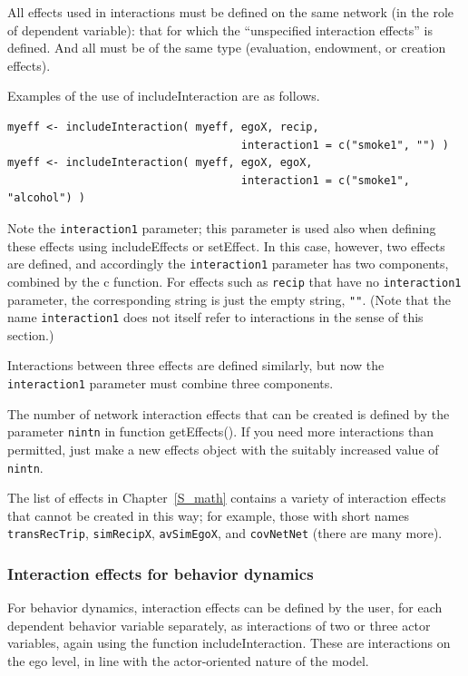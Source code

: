 \documentclass[a4paper,fleqn,11pt]{article}
\newcommand{\+}{\, + \,}
\newcommand{\sfn}[1]{\textsf{#1}}
\begin{document}
All effects used in interactions must be defined on the same network
(in the role of dependent variable): that for
which the ``unspecified
interaction effects'' is defined.  And all must be
of the same type (evaluation, endowment, or creation effects).

Examples of the use of \sfn{includeInteraction} are as follows.
\begin{verbatim}
myeff <- includeInteraction( myeff, egoX, recip,
                                    interaction1 = c("smoke1", "") )
myeff <- includeInteraction( myeff, egoX, egoX,
                                    interaction1 = c("smoke1", "alcohol") )
\end{verbatim}
Note the \texttt{interaction1} parameter; this parameter is used also
when defining these effects using \sfn{includeEffects} or
\sfn{setEffect}. In this case, however, two effects are defined,
and accordingly the \texttt{interaction1} parameter has two components,
combined by the \sfn{c} function.
For effects such as \texttt{recip} that have no \texttt{interaction1}
parameter, the corresponding string is just the empty string, \texttt{""}.
(Note that the name \texttt{interaction1} does not itself refer to interactions
in the sense of this section.)

Interactions between three effects are defined similarly,
but now the \texttt{interaction1} parameter must combine three components.

The number of network interaction effects that can be created is defined by the
parameter \texttt{nintn} in function \sfn{getEffects()}. If you need more
interactions than permitted, just make a new effects object with the
suitably increased value of \texttt{nintn}.

The list of effects in Chapter~\ref{S_math} contains a variety of
interaction effects that cannot be created in this way;
for example, those with short names
\texttt{transRecTrip}, \texttt{simRecipX},  \texttt{avSimEgoX},
and \texttt{covNetNet} (there are many more).

\subsubsection{Interaction effects for behavior dynamics}
\label{S_beh_infl}

For behavior dynamics, interaction effects can be defined
by the user, for each dependent behavior variable separately,
as interactions of two or three actor variables,
again using the function \textsf{includeInteraction}.
These are interactions on the ego level, in line with the
actor-oriented nature of the model.
\end{document}

